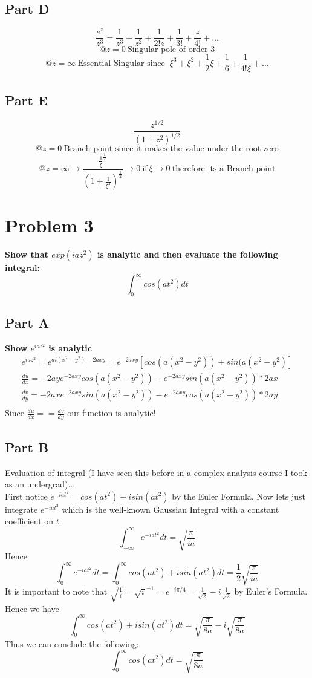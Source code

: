 \documentclass[10pt,a4paper]{article}
\begin{document}
	\subsection{Part D}
	$$\frac{e^z}{z^3} = \frac{1}{z^3}+\frac{1}{z^2}+\frac{1}{2!z}+\frac{1}{3!} + \frac{z}{4!} + \dots$$
	$$@z=0 \ \text{Singular pole of order 3}$$
	$$@z=\infty \ \text{Essential Singular since } \ \xi^3+\xi^2+\frac{1}{2}\xi+\frac{1}{6} + \frac{1}{4!\xi}+\dots$$
	\subsection{Part E}
	$$\frac{z^{1/2}}{(1+z^2)^{1/2}}$$
	$$@z=0 \ \text{Branch point since it makes the value under the root zero}$$
	$$@z=\infty \rightarrow \frac{\frac{1}{\xi}^{\frac{1}{2}}}{(1+\frac{1}{\xi^2})^{\frac{1}{2}}} \rightarrow 0 \ \text{if} \ \xi\rightarrow 0 \ \text{therefore its a Branch point} $$
	
	\section{Problem 3}
	\textbf{Show that $exp(iaz^2)$ is analytic and then evaluate the following integral:}
	$$\int_0^{\infty} cos(at^2)dt $$
	\subsection{Part A}
	\textbf{Show $e^{iaz^2}$ is analytic}
	\begin{equation}
	\nonumber
	\begin{gathered}
	e^{iaz^2} = e^{ai(x^2-y^2)-2axy} = e^{-2axy}[cos(a(x^2-y^2))+sin(a(x^2-y^2)]\\
	\frac{du}{dx} = -2aye^{-2axy}cos(a(x^2-y^2))-e^{-2axy}sin(a(x^2-y^2))*2ax\\
	\frac{dv}{dy} = -2axe^{-2axy}sin(a(x^2-y^2))-e^{-2axy}cos(a(x^2-y^2))*2ay\\
	\end{gathered}
	\end{equation}
	Since $\frac{du}{dx} == \frac{dv}{dy}$ our function is analytic!
	\subsection{Part B}
	Evaluation of integral (I have seen this before in a complex analysis course I took as an undergrad)...\\
	First notice $e^{-iat^2} = cos(at^2)+isin(at^2)$ by the Euler Formula. Now lets just integrate $e^{-iat^2}$ which is the well-known Gaussian Integral with a constant coefficient on $t$.
	$$\int_{-\infty}^{\infty} e^{-iat^2} dt = \sqrt{\frac{\pi}{ia}} $$
	Hence $$\int_{0}^{\infty} e^{-iat^2} dt = \int_{0}^{\infty} cos(at^2)+isin(at^2) dt= \frac{1}{2}\sqrt{\frac{\pi}{ia}} $$
	It is important to note that $\sqrt{\frac{1}{i}} = \sqrt{i}^{-1} = e^{-i\pi /4 } = \frac{1}{\sqrt{2}}-i\frac{1}{\sqrt{2}}$ by Euler's Formula.
	Hence we have 
	$$\int_{0}^{\infty} cos(at^2)+isin(at^2) dt = \sqrt{\frac{\pi}{8a}} - i\sqrt{\frac{\pi}{8a}}  $$
	Thus we can conclude the following:
	$$\int_{0}^{\infty} cos(at^2) dt = \sqrt{\frac{\pi}{8a}} $$
\end{document}

